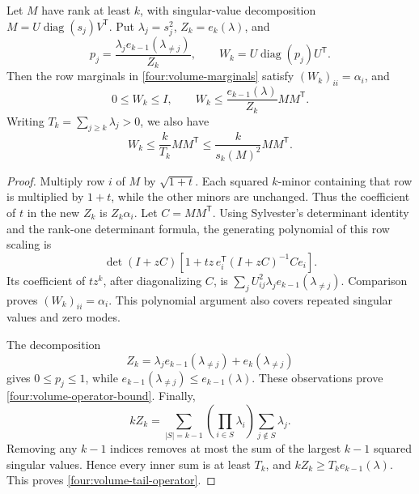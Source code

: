 \begin{proposition}
\label{four:volume-operator}
Let \(M\) have rank at least \(k\), with singular-value
decomposition \(M=U\operatorname{diag}(s_j)V^{\mathsf T}\).
Put \(\lambda_j=s_j^2\), \(Z_k=e_k(\lambda)\), and
\[
 p_j=\frac{\lambda_je_{k-1}(\lambda_{\ne j})}{Z_k},
 \qquad W_k=U\operatorname{diag}(p_j)U^{\mathsf T}.
\]
Then the row marginals in \eqref{four:volume-marginals} satisfy
\((W_k)_{ii}=\alpha_i\), and
\begin{equation}\label{four:volume-operator-bound}
 0\leq W_k\leq I,\qquad
 W_k\leq\frac{e_{k-1}(\lambda)}{Z_k}MM^{\mathsf T}.
\end{equation}
Writing \(T_k=\sum_{j\geq k}\lambda_j>0\), we also have
\begin{equation}\label{four:volume-tail-operator}
 W_k\leq\frac{k}{T_k}MM^{\mathsf T}
       \leq\frac{k}{s_k(M)^2}MM^{\mathsf T}.
\end{equation}
\end{proposition}
\begin{proof}
Multiply row \(i\) of \(M\) by \(\sqrt{1+t}\).
Each squared \(k\)-minor containing that row is multiplied by
\(1+t\), while the other minors are unchanged.  Thus the
coefficient of \(t\) in the new \(Z_k\) is \(Z_k\alpha_i\).
Let \(C=MM^{\mathsf T}\).  Using Sylvester's determinant
identity and the rank-one determinant formula, the generating
polynomial of this row scaling is
\[
 \det(I+zC)
 \left[1+tz\,e_i^{\mathsf T}(I+zC)^{-1}Ce_i\right].
\]
Its coefficient of \(tz^k\), after diagonalizing \(C\), is
\(\sum_jU_{ij}^2\lambda_je_{k-1}(\lambda_{\ne j})\).
Comparison proves \((W_k)_{ii}=\alpha_i\).  This polynomial
argument also covers repeated singular values and zero modes.

The decomposition
\[
 Z_k=\lambda_je_{k-1}(\lambda_{\ne j})
                         +e_k(\lambda_{\ne j})
\]
gives \(0\leq p_j\leq1\), while
\(e_{k-1}(\lambda_{\ne j})\leq e_{k-1}(\lambda)\).
These observations prove \eqref{four:volume-operator-bound}.
Finally,
\[
 kZ_k=\sum_{|S|=k-1}\left(\prod_{i\in S}\lambda_i\right)
                           \sum_{j\notin S}\lambda_j.
\]
Removing any \(k-1\) indices removes at most the sum of the
largest \(k-1\) squared singular values.  Hence every inner
sum is at least \(T_k\), and
\(kZ_k\geq T_ke_{k-1}(\lambda)\).
This proves \eqref{four:volume-tail-operator}.
\end{proof}

